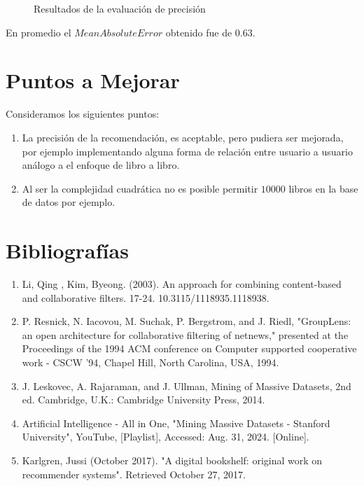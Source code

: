 \documentclass[14pt]{extarticle}
\begin{document}
\begin{figure}[H]
    \centering
    
    \caption{Resultados de la evaluación de precisión}
    \label{fig:precision-plot}
\end{figure}

En promedio el $Mean Absolute Error$ obtenido fue de $0.63$. 

\section{Puntos a Mejorar}

Consideramos los siguientes puntos:

\begin{enumerate}
    \item La precisión de la recomendación, es aceptable, pero pudiera ser mejorada, por ejemplo implementando alguna forma de relación entre usuario a usuario análogo a el enfoque de libro a libro.
    \item Al ser la complejidad cuadrática no es posible permitir $10000$ libros en la base de datos por ejemplo.
\end{enumerate}



\section{Bibliografías}

\begin{enumerate}
    \item Li, Qing , Kim, Byeong. (2003). An approach for combining content-based and collaborative filters. 17-24. 10.3115/1118935.1118938. 
    \item P. Resnick, N. Iacovou, M. Suchak, P. Bergstrom, and J. Riedl, "GroupLens: an open architecture for collaborative filtering of netnews," presented at the Proceedings of the 1994 ACM conference on Computer supported cooperative work - CSCW '94, Chapel Hill, North Carolina, USA, 1994.
    \item J. Leskovec, A. Rajaraman, and J. Ullman, Mining of Massive Datasets, 2nd ed. Cambridge, U.K.: Cambridge University Press, 2014.
    \item Artificial Intelligence - All in One, "Mining Massive Datasets - Stanford University", YouTube, [Playlist], Accessed: Aug. 31, 2024. [Online]. 
    \item Karlgren, Jussi (October 2017). "A digital bookshelf: original work on recommender systems". Retrieved October 27, 2017.
\end{enumerate}
\end{document}
